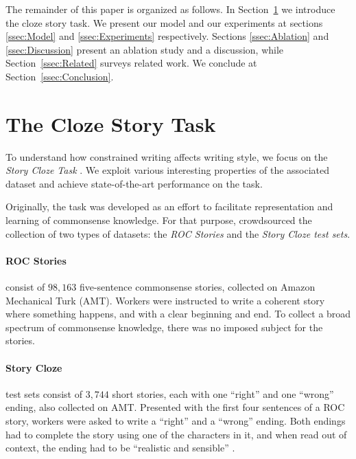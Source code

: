 \documentclass[11pt,a4paper]{article}
\newcommand{\secref}[1]{Section~\ref{ssec:#1}}
\newcommand{\isection}[2]{\section{#1}\label{ssec:#2}}
\newcommand{\roy}[1]{\footnote{\color{red}{\textbf{Roy: #1}}}}
\begin{document}
The remainder of this paper is organized as follows. In \secref{ROC_Story} we introduce the cloze story task.
We present our model and our experiments at sections \ref{ssec:Model} and \ref{ssec:Experiments} respectively.
Sections \ref{ssec:Ablation} and \ref{ssec:Discussion} present an ablation study and a discussion, while \secref{Related}  surveys related work. 
We conclude at \secref{Conclusion}.

\isection{The Cloze Story Task}{ROC_Story}
To understand how constrained writing affects writing style, we focus on the \textit{Story Cloze Task} \cite{Mostafazadeh:2016}. We exploit various interesting properties of the associated dataset and achieve state-of-the-art performance on the task.

Originally, the task was developed as an effort to facilitate representation and learning of commonsense knowledge. For that purpose, \citet{Mostafazadeh:2016} crowdsourced the collection of two types of datasets: the \textit{ROC Stories} and the \textit{Story Cloze test sets}.


\paragraph{ROC Stories}
consist of $98,163$ %
five-sentence commonsense stories, collected on Amazon Mechanical Turk (AMT). Workers were instructed to write a coherent story where something happens, and with%
a clear beginning and end. To collect a broad spectrum of commonsense knowledge, there was no imposed subject for the stories.
\paragraph{Story Cloze}%
test sets consist of $3,744$ short stories, each with one ``right'' and one ``wrong'' ending, also collected on AMT.
Presented with the first four sentences of a ROC story, workers were asked to write a ``right'' and a ``wrong'' ending. Both endings had to complete the story using one of the characters in it, and when read out of context, the ending had to be ``realistic and sensible'' \cite{Mostafazadeh:2016}.
\end{document}
